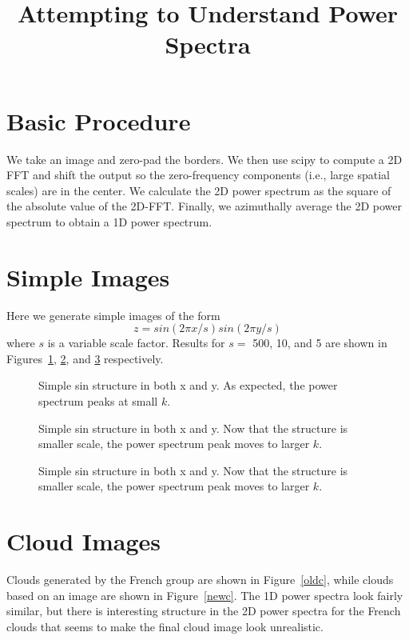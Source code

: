 \documentclass[11pt,preprint]{aastex}
\begin{document}
\title{Attempting to Understand Power Spectra}



\section{Basic Procedure}

We take an image and zero-pad the borders.  We then use scipy to compute a 2D FFT and shift the output so the zero-frequency components (i.e., large spatial scales) are in the center.  We calculate the 2D power spectrum as the square of the absolute value of the 2D-FFT.  Finally, we azimuthally average the 2D power spectrum to obtain a 1D power spectrum.


\section{Simple Images}

Here we generate simple images of the form
\begin{equation}
z = sin(2 \pi x/s)sin(2 \pi y/s)
\end{equation}
where $s$ is a variable scale factor.  Results for $s=$ 500, 10, and 5 are shown in Figures~\ref{s500}, \ref{s10}, and \ref{s5} respectively.


\begin{figure}
\caption{Simple sin structure in both x and y.  As expected, the power spectrum peaks at small $k$. \label{s500}}
\end{figure}

\begin{figure}
\caption{Simple sin structure in both x and y.  Now that the structure is smaller scale, the power spectrum peak moves to larger $k$. \label{s10}}
\end{figure}


\begin{figure}
\caption{Simple sin structure in both x and y.  Now that the structure is smaller scale, the power spectrum peak moves to larger $k$. \label{s5}}
\end{figure}


\section{Cloud Images}

Clouds generated by the French group are shown in Figure~\ref{oldc}, while clouds based on an image are shown in Figure~\ref{newc}.  The 1D power spectra look fairly similar, but there is interesting structure in the 2D power spectra for the French clouds that seems to make the final cloud image look unrealistic.
\end{document}
